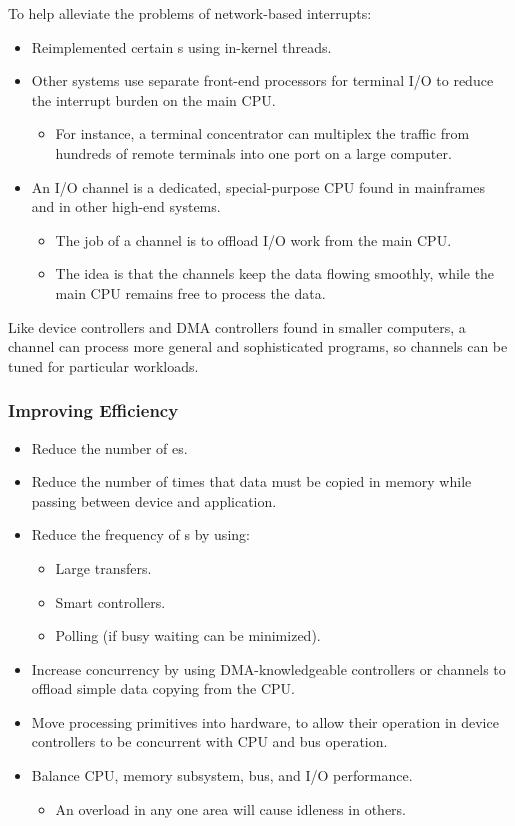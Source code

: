 To help alleviate the problems of network-based interrupts:
\begin{itemize}[noitemsep]
\item Reimplemented certain s using in-kernel threads.
\item Other systems use separate front-end processors for terminal I/O to reduce the interrupt burden on the main CPU.\@
  \begin{itemize}[noitemsep]
  \item For instance, a terminal concentrator can multiplex the traffic from hundreds of remote terminals into one port on a large computer.
  \end{itemize}
\item An I/O channel is a dedicated, special-purpose CPU found in mainframes and in other high-end systems.
  \begin{itemize}[noitemsep]
  \item The job of a channel is to offload I/O work from the main CPU.\@
  \item The idea is that the channels keep the data flowing smoothly, while the main CPU remains free to process the data.
  \end{itemize}
\end{itemize}

Like device controllers and DMA controllers found in smaller computers, a channel can process more general and sophisticated programs, so channels can be tuned for particular workloads.

\subsubsection{Improving Efficiency}\label{subsubsec:Improve_IO_Subsystem_Performance}
\begin{itemize}[noitemsep]
\item Reduce the number of es.
\item Reduce the number of times that data must be copied in memory while passing between device and application.
\item Reduce the frequency of s by using:
  \begin{itemize}[noitemsep]
  \item Large transfers.
  \item Smart controllers.
  \item Polling (if busy waiting can be minimized).
  \end{itemize}
\item Increase concurrency by using DMA-knowledgeable controllers or channels to offload simple data copying from the CPU.\@
\item Move processing primitives into hardware, to allow their operation in device controllers to be concurrent with CPU and bus operation.
\item Balance CPU, memory subsystem, bus, and I/O performance.
  \begin{itemize}[noitemsep]
  \item An overload in any one area will cause idleness in others.
  \end{itemize}
\end{itemize}

